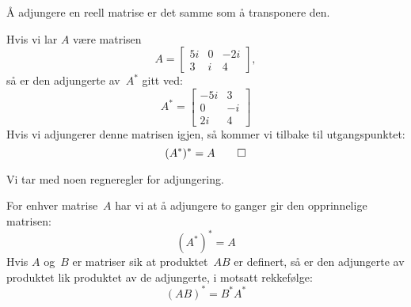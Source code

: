 \begin{merkx}
Å adjungere en reell matrise er det samme som å transponere den.
\end{merkx}


\begin{ex}
Hvis vi lar $A$ være matrisen
\[
A =
\begin{bmatrix}
5i & 0 & -2i \\
3 & i &  4
\end{bmatrix},
\]
så er den adjungerte av~$A^*$ gitt ved:
\[
A^* =
\begin{bmatrix}
 -5i & 3 \\
 0 & -i \\
2i & 4
\end{bmatrix}
\]
Hvis vi adjungerer denne matrisen igjen, så kommer vi tilbake til
utgangspunktet:
\[
(A^*)^* = A\qedhere
\]
\end{ex}

\noindent Vi tar med noen regneregler for adjungering.

\begin{thm}
For enhver matrise~$A$ har vi at å adjungere to ganger gir den
opprinnelige matrisen:
\[
(A^*)^* = A
\]
Hvis $A$ og~$B$ er matriser sik at produktet~$AB$ er definert, så er
den adjungerte av produktet lik produktet av de adjungerte, i
motsatt rekkefølge:
\[
(AB)^* = B^* A^*
\]
\end{thm}


